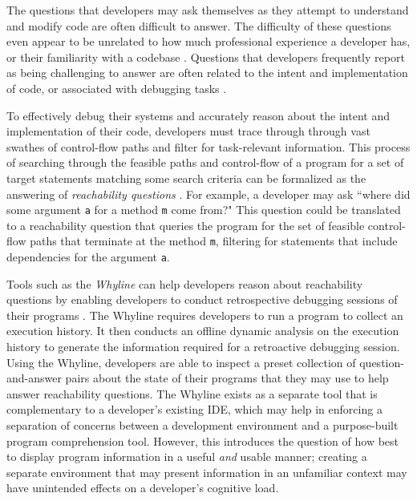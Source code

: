 \par The questions that developers may ask themselves as they attempt to 
understand and modify code are often difficult to answer. 
The difficulty of these questions even appear to be unrelated to how much
professional experience a developer has, or their familiarity with a codebase
\cite{latoza-2010-reach}.
Questions that developers frequently report as being challenging to answer are
often related to the intent and implementation of code, or associated with 
debugging tasks \cite{latoza-2010-hard-questions}.
\par To effectively debug their systems and accurately reason about the
intent and implementation of their code, developers must trace through
through vast swathes of control-flow paths and filter for task-relevant 
information.
This process of searching through the feasible paths and control-flow of a
program for a set of target statements matching some search criteria can be
formalized as the answering of \emph{reachability questions}
\cite{latoza-2010-reach}.
For example, a developer may ask ``where did some argument \texttt{a} for a 
method \texttt{m} come from?"
This question could be translated to a reachability question that queries the
program for the set of feasible control-flow paths that terminate at the
method \texttt{m}, filtering for statements that include dependencies for
the argument \texttt{a}.

\par Tools such as the \emph{Whyline} can help developers reason about
reachability questions by enabling developers to conduct retrospective
debugging sessions of their programs \cite{ko-2004-whyline}.
The Whyline requires developers to run a program to collect an execution 
history.
It then conducts an offline dynamic analysis on the execution history to 
generate the information required for a retroactive debugging session.
Using the Whyline, developers are able to inspect a preset collection of 
question-and-answer pairs about the state of their programs that they may use 
to help answer reachability questions.
The Whyline exists as a separate tool that is complementary to a developer's
existing \ac{IDE}, which may help in enforcing a separation of concerns between
a development environment and a purpose-built program comprehension tool.
However, this introduces the question of how best to display program 
information in a useful \emph{and} usable manner; creating a separate 
environment that may present information in an unfamiliar context may have 
unintended effects on a developer's cognitive load.

